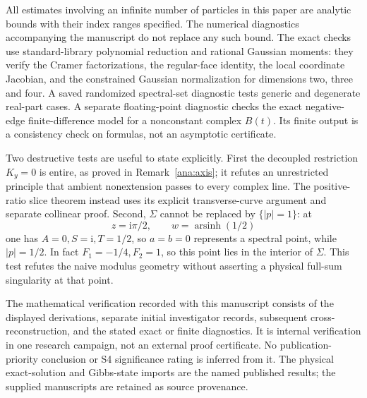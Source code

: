 \documentclass[11pt]{article}
\numberwithin{equation}{section}
\theoremstyle{definition}
\newcommand{\ii}{\mathrm i}
\begin{document}
All estimates involving an infinite number of particles in this paper
are analytic bounds with their index ranges specified. The numerical
diagnostics accompanying the manuscript do not replace any such bound.
The exact checks use standard-library polynomial reduction and rational
Gaussian moments: they verify the Cramer factorizations, the regular-face
identity, the local coordinate Jacobian, and the constrained Gaussian
normalization for dimensions two, three and four. A saved randomized
spectral-set diagnostic tests generic and degenerate real-part cases.
A separate floating-point diagnostic checks the exact negative-edge
finite-difference model for a nonconstant complex \(B(t)\). Its
finite output is a consistency check on formulas, not an asymptotic
certificate.

Two destructive tests are useful to state explicitly. First the
decoupled restriction \(K_y=0\) is entire, as proved in
Remark~\ref{ana:axis}; it refutes an unrestricted principle that
ambient nonextension passes to every complex line. The positive-ratio
slice theorem instead uses its explicit transverse-curve argument and
separate collinear proof. Second, \(\Sigma\) cannot be replaced by
\(\{|p|=1\}\): at
\[
 z=\ii\pi/2,\qquad w=\operatorname{arsinh}(1/2)
\]
one has \(A=0,S=\ii,T=1/2\), so \(a=b=0\) represents a
spectral point, while \(|p|=1/2\). In fact \(F_1=-1/4,F_2=1\),
so this point lies in the interior of \(\Sigma\). This test refutes
the naive modulus geometry without asserting a physical full-sum
singularity at that point.

The mathematical verification recorded with this manuscript consists
of the displayed derivations, separate initial investigator records,
subsequent cross-reconstruction, and the stated exact or finite
diagnostics. It is internal verification in one research campaign,
not an external proof certificate. No publication-priority conclusion
or S4 significance rating is inferred from it. The physical
exact-solution and Gibbs-state imports are the named published results;
the supplied manuscripts are retained as source provenance.
\end{document}
